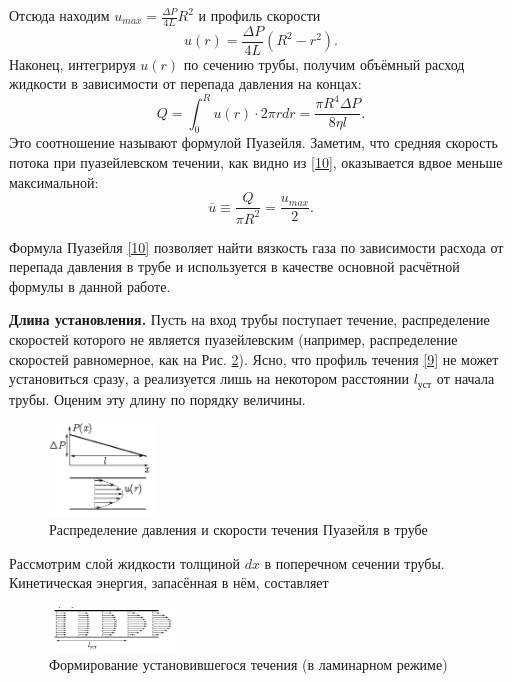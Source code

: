 \documentclass[a4paper, 12pt]{article}
\begin{document}
Отсюда находим $u_{max} = \frac{\Delta{P}}{4L}R^2$ и профиль скорости
\begin{equation}\label{9}
u(r) = \frac{\Delta{P}}{4L}(R^2 - r^2).
\end{equation}
Наконец, интегрируя $u(r)$ по сечению трубы, получим объёмный расход жидкости в зависимости от перепада давления на концах:
\begin{equation}\label{10}
Q = \int_0^R u(r) \cdot 2\pi rdr=\frac{\pi R^4\Delta{P}}{8\eta l}.
\end{equation}
Это соотношение называют формулой Пуазейля. Заметим, что средняя скорость потока при пуазейлевском течении, как видно из \eqref{10}, оказывается
вдвое меньше максимальной:
\begin{equation}\label{11}
\overline{u} \equiv \frac{Q}{\pi R^2} = \frac{u_{max}}{2}.
\end{equation}
\par Формула Пуазейля \eqref{10} позволяет найти вязкость газа по зависимости расхода от перепада давления в трубе и используется в качестве основной расчётной формулы в данной работе.
\par {\bf Длина установления.} Пусть на вход трубы поступает течение, распределение скоростей которого не является пуазейлевским (например, распределение скоростей равномерное, как на Рис. \ref{ris3}). Ясно, что профиль течения \eqref{9} не может установиться сразу, а реализуется лишь на некотором расстоянии $l_{\text{уст}}$ от начала трубы. Оценим эту длину по порядку величины.
\begin{figure}
\includegraphics[width=0.25\textwidth]{2.png}
\caption{Распределение давления и скорости течения Пуазейля в трубе}
\label{ris2}
\end{figure}
\par Рассмотрим слой жидкости толщиной $dx$ в поперечном сечении трубы. Кинетическая энергия, запасённая в нём, составляет
\begin{figure}
\includegraphics[width=0.3\textwidth]{3.png}
\caption{Формирование установившегося течения (в ламинарном режиме)}
\label{ris3}
\end{figure}
\end{document}
